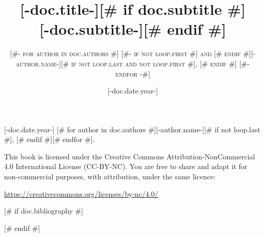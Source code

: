 \documentclass[letterpaper,11pt,oneside,openany]{book}
\title{\Huge \textbf{[-doc.title-]}[# if doc.subtitle #] \\[0.5em] \huge [-doc.subtitle-][# endif #]}
\author{\textsc{
[#- for author in doc.authors #]
  [#- if not loop.first #] and [# endif #][-author.name-][# if not loop.last and not loop.first #], [# endif #]
[#- endfor -#]
}}
[# if doc.date #]\date{[-doc.date.year-]}[# endif #]
\begin{document}
\sloppy

\frontmatter
\maketitle

\thispagestyle{empty}
\null\vfill
\noindent\small
\textcopyright{} [-doc.date.year-] [# for author in doc.authors #][-author.name-][# if not loop.last #], [# endif #][# endfor #].\par\medskip
\noindent This book is licensed under the Creative Commons
Attribution\--NonCommercial 4.0 International License (CC\--BY\--NC).
You are free to share and adapt it for non-commercial purposes, with
attribution, under the same licence:\par\smallskip
\noindent\url{https://creativecommons.org/licenses/by-nc/4.0/}\par\vfill\normalsize

\tableofcontents

\mainmatter
[- CONTENT -]

[# if doc.bibliography #]

[# endif #]
\end{document}
